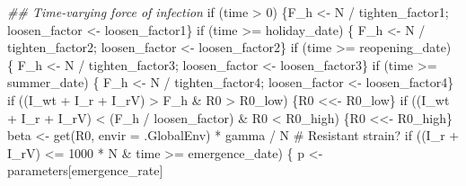 \documentclass[
  11pt,
  letterpaper,
  DIV=11,
  numbers=noendperiod]{scrartcl}
\newenvironment{Shaded}{\begin{snugshade}}{\end{snugshade}}
\newcommand{\AttributeTok}[1]{\textcolor[rgb]{0.40,0.45,0.13}{#1}}
\newcommand{\CommentTok}[1]{\textcolor[rgb]{0.37,0.37,0.37}{#1}}
\newcommand{\ControlFlowTok}[1]{\textcolor[rgb]{0.00,0.23,0.31}{#1}}
\newcommand{\DecValTok}[1]{\textcolor[rgb]{0.68,0.00,0.00}{#1}}
\newcommand{\DocumentationTok}[1]{\textcolor[rgb]{0.37,0.37,0.37}{\textit{#1}}}
\newcommand{\FunctionTok}[1]{\textcolor[rgb]{0.28,0.35,0.67}{#1}}
\newcommand{\NormalTok}[1]{\textcolor[rgb]{0.00,0.23,0.31}{#1}}
\newcommand{\OtherTok}[1]{\textcolor[rgb]{0.00,0.23,0.31}{#1}}
\newcommand{\SpecialCharTok}[1]{\textcolor[rgb]{0.37,0.37,0.37}{#1}}
\newcommand{\StringTok}[1]{\textcolor[rgb]{0.13,0.47,0.30}{#1}}
\begin{document}
\begin{Shaded}
\begin{Highlighting}[]
    \DocumentationTok{\#\# Time{-}varying force of  infection}
    \ControlFlowTok{if}\NormalTok{ (time }\SpecialCharTok{\textgreater{}} \DecValTok{0}\NormalTok{)   \{F\_h }\OtherTok{\textless{}{-}}\NormalTok{ N }\SpecialCharTok{/}\NormalTok{ tighten\_factor1; loosen\_factor }\OtherTok{\textless{}{-}}\NormalTok{ loosen\_factor1\}}
    \ControlFlowTok{if}\NormalTok{ (time }\SpecialCharTok{\textgreater{}=}\NormalTok{ holiday\_date) \{}
\NormalTok{        F\_h }\OtherTok{\textless{}{-}}\NormalTok{ N }\SpecialCharTok{/}\NormalTok{ tighten\_factor2; loosen\_factor }\OtherTok{\textless{}{-}}\NormalTok{ loosen\_factor2\}}
    \ControlFlowTok{if}\NormalTok{ (time }\SpecialCharTok{\textgreater{}=}\NormalTok{ reopening\_date) \{}
\NormalTok{        F\_h }\OtherTok{\textless{}{-}}\NormalTok{ N }\SpecialCharTok{/}\NormalTok{ tighten\_factor3; loosen\_factor }\OtherTok{\textless{}{-}}\NormalTok{ loosen\_factor3\}}
    \ControlFlowTok{if}\NormalTok{ (time }\SpecialCharTok{\textgreater{}=}\NormalTok{ summer\_date) \{}
\NormalTok{        F\_h }\OtherTok{\textless{}{-}}\NormalTok{ N }\SpecialCharTok{/}\NormalTok{ tighten\_factor4; loosen\_factor }\OtherTok{\textless{}{-}}\NormalTok{ loosen\_factor4\}}
    \ControlFlowTok{if}\NormalTok{ ((I\_wt }\SpecialCharTok{+}\NormalTok{ I\_r }\SpecialCharTok{+}\NormalTok{ I\_rV) }\SpecialCharTok{\textgreater{}}\NormalTok{ F\_h }\SpecialCharTok{\&}\NormalTok{ R0 }\SpecialCharTok{\textgreater{}}\NormalTok{ R0\_low)                   \{R0 }\OtherTok{\textless{}\textless{}{-}}\NormalTok{ R0\_low\}}
    \ControlFlowTok{if}\NormalTok{ ((I\_wt }\SpecialCharTok{+}\NormalTok{ I\_r }\SpecialCharTok{+}\NormalTok{ I\_rV) }\SpecialCharTok{\textless{}}\NormalTok{ (F\_h }\SpecialCharTok{/}\NormalTok{ loosen\_factor) }\SpecialCharTok{\&}\NormalTok{ R0 }\SpecialCharTok{\textless{}}\NormalTok{ R0\_high)  \{R0 }\OtherTok{\textless{}\textless{}{-}}\NormalTok{ R0\_high\}}
\NormalTok{    beta  }\OtherTok{\textless{}{-}} \FunctionTok{get}\NormalTok{(}\StringTok{\textquotesingle{}R0\textquotesingle{}}\NormalTok{, }\AttributeTok{envir =}\NormalTok{ .GlobalEnv) }\SpecialCharTok{*}\NormalTok{ gamma }\SpecialCharTok{/}\NormalTok{ N}
    \CommentTok{\# Resistant strain?}
    \ControlFlowTok{if}\NormalTok{ ((I\_r }\SpecialCharTok{+}\NormalTok{ I\_rV) }\SpecialCharTok{\textless{}=} \DecValTok{1000} \SpecialCharTok{*}\NormalTok{ N }\SpecialCharTok{\&}\NormalTok{ time }\SpecialCharTok{\textgreater{}=}\NormalTok{ emergence\_date) \{}
\NormalTok{        p }\OtherTok{\textless{}{-}}\NormalTok{ parameters[}\StringTok{\textquotesingle{}emergence\_rate\textquotesingle{}}\NormalTok{]}

\end{Highlighting}
\end{Shaded}
\end{document}
